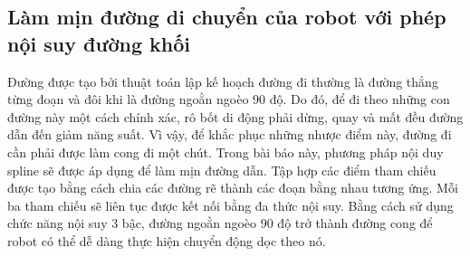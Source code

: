 \subsection{Làm mịn đường di chuyển của robot với phép nội suy đường khối}
Đường được tạo bởi thuật toán lập kế hoạch đường đi thường là đường thẳng từng đoạn và đôi khi là đường ngoằn ngoèo 90 độ. Do đó, để đi theo những con đường này một cách chính xác, rô bốt di động phải dừng, quay và mất đều đường dẫn đến giảm năng suất. Vì vậy, để khắc phục những nhược điểm này, đường đi cần phải được làm cong đi một chút. Trong bài báo này, phương pháp nội duy spline sẽ được áp dụng để làm mịn đường dẫn. Tập hợp các điểm tham chiếu được tạo bằng cách chia các đường rẽ thành các đoạn bằng nhau tương ứng. Mỗi ba tham chiếu sẽ liên tục được kết nối bằng đa thức nội suy. Bằng cách sử dụng chức năng nội suy 3 bậc, đường ngoằn ngoèo 90 độ trở thành đường cong để robot có thể dễ dàng thực hiện chuyển động dọc theo nó.